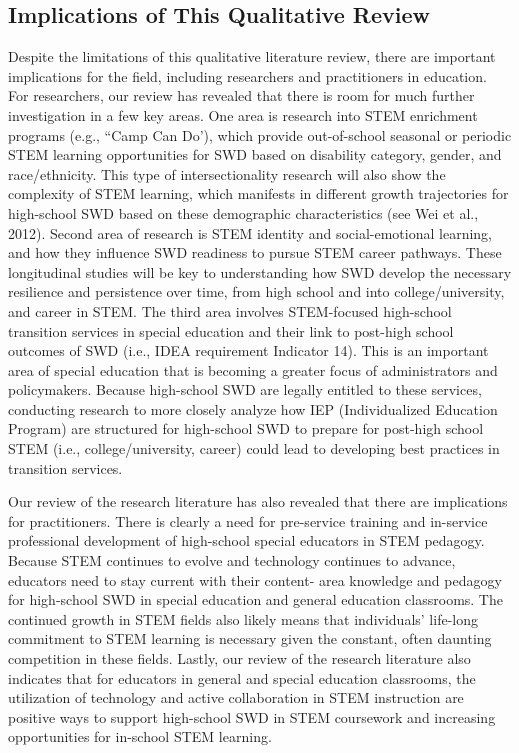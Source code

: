\documentclass[11.5pt]{sig-alternate}
\begin{document}
\begin{large}
\subsection*{Implications of This Qualitative Review}
Despite the limitations of this qualitative literature review, there are important implications for the field, including researchers and practitioners in education. For researchers, our review has revealed that there is room for much further investigation in a few key areas. One area is research into STEM enrichment programs (e.g., “Camp Can Do’), which provide out-of-school seasonal or periodic STEM learning opportunities for SWD based on disability category, gender, and race/ethnicity. This type of intersectionality research will also show the complexity of STEM learning, which manifests in different growth trajectories for high-school SWD based on these demographic characteristics (see Wei et al., 2012). Second area of research is STEM identity and social-emotional learning, and how they influence SWD readiness to pursue STEM career pathways. These longitudinal studies will be key to understanding how SWD develop the necessary resilience and persistence over time, from high school and into college/university, and career in STEM. The third area involves STEM-focused high-school transition services in special education and their link to post-high school outcomes of SWD (i.e., IDEA requirement Indicator 14). This is an important area of special education that is becoming a greater focus of administrators and policymakers. Because high-school SWD are legally entitled to these services, conducting research to more closely analyze how IEP (Individualized Education Program) are structured for high-school SWD to prepare for post-high school STEM (i.e., college/university, career) could lead to developing best practices in transition services.   

Our review of the research literature has also revealed that there are implications for practitioners. There is clearly a need for pre-service training and in-service professional development of high-school special educators in STEM pedagogy. Because STEM continues to evolve and technology continues to advance, educators need to stay current with their content- area knowledge and pedagogy for high-school SWD in special education and general education classrooms. The continued growth in STEM fields also likely means that individuals’ life-long commitment to STEM learning is necessary given the constant, often daunting competition in these fields. Lastly, our review of the research literature also indicates that for educators in general and special education classrooms, the utilization of technology and active collaboration in STEM instruction are positive ways to support high-school SWD in STEM coursework and increasing opportunities for in-school STEM learning. 

\end{large}
\clearpage
\end{document}

